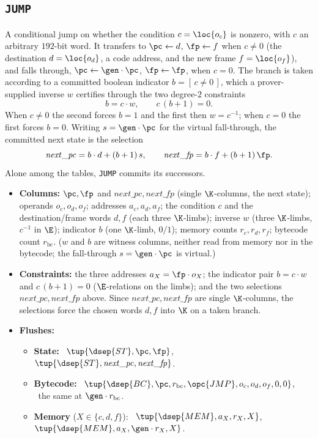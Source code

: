 \subsection{\texttt{JUMP}}\label{sec:tab-jump}

A conditional jump on whether the condition $c=\loc{o_c}$ is nonzero, with $c$ an arbitrary $192$-bit word. It transfers to $\pc\gets d$, $\fp\gets f$ when $c\neq0$ (the destination $d=\loc{o_d}$, a code address, and the new frame $f=\loc{o_f}$), and falls through, $\pc\gets\gen\cdot\pc$, $\fp\gets\fp$, when $c=0$. The branch is taken according to a committed boolean indicator $b=[\,c\neq0\,]$, which a prover-supplied inverse $w$ certifies through the two degree-$2$ constraints
\[
  b=c\cdot w,\qquad c\,(b+1)=0 .
\]
When $c\neq0$ the second forces $b=1$ and the first then $w=c^{-1}$; when $c=0$ the first forces $b=0$. Writing $s=\gen\cdot\pc$ for the virtual fall-through, the committed next state is the selection
\[
  \mathit{next\_pc}=b\cdot d+(b+1)\,s,\qquad \mathit{next\_fp}=b\cdot f+(b+1)\,\fp.
\]
Alone among the tables, \texttt{JUMP} commits its successors.
\begin{itemize}
\item \textbf{Columns:} $\pc,\fp$ and $\mathit{next\_pc},\mathit{next\_fp}$ (single $\K$-columns, the next state); operands $o_c,o_d,o_f$; addresses $a_c,a_d,a_f$; the condition $c$ and the destination/frame words $d,f$ (each three $\K$-limbs); inverse $w$ (three $\K$-limbs, $c^{-1}$ in $\E$); indicator $b$ (one $\K$-limb, $0/1$); memory counts $r_c,r_d,r_f$; bytecode count $r_{\mathrm{bc}}$. ($w$ and $b$ are witness columns, neither read from memory nor in the bytecode; the fall-through $s=\gen\cdot\pc$ is virtual.)
\item \textbf{Constraints:} the three addresses $a_X=\fp\cdot o_X$; the indicator pair $b=c\cdot w$ and $c\,(b+1)=0$ ($\E$-relations on the limbs); and the two selections $\mathit{next\_pc},\mathit{next\_fp}$ above. Since $\mathit{next\_pc},\mathit{next\_fp}$ are single $\K$-columns, the selections force the chosen words $d,f$ into $\K$ on a taken branch.
\item \textbf{Flushes:}
  \begin{itemize}
  \item \textbf{State:} \pull\ $\tup{\dsep{ST},\pc,\fp}$, \push\ $\tup{\dsep{ST},\mathit{next\_pc},\mathit{next\_fp}}$.
  \item \textbf{Bytecode:} \pull\ $\tup{\dsep{BC},\pc,r_{\mathrm{bc}},\opc{JMP},o_c,o_d,o_f,0,0}$, \push\ the same at $\gen\cdot r_{\mathrm{bc}}$.
  \item \textbf{Memory} ($X\in\{c,d,f\}$): \pull\ $\tup{\dsep{MEM},a_X,r_X,X}$, \push\ $\tup{\dsep{MEM},a_X,\gen\cdot r_X,X}$.
  \end{itemize}
\end{itemize}

